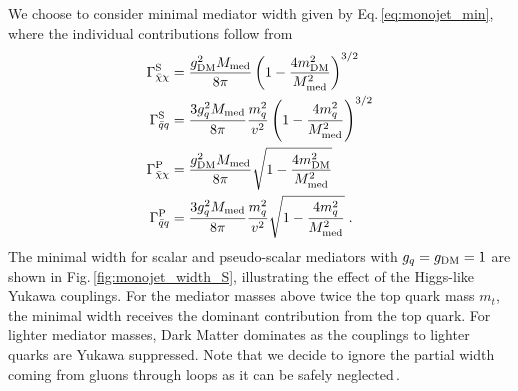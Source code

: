 We choose to consider minimal mediator width given by Eq.\,\ref{eq:monojet_min}, where the individual contributions follow from
\begin{align}
\Gamma_{\bar{\chi}\chi}^{\rm{S}}&=\frac{\gDM^2 \mMed}{8\pi}\left(1-\frac{4 \mDM^2}{\mMed^2} \right)^{3/2}\\
\Gamma_{\bar{q}q}^{\rm{S}}&= \frac{3 \gq^2 \mMed}{8\pi}\frac{m_q^2}{v^2}\left(1-\frac{4 m_q^2}{\mMed^2}\right)^{3/2}\\
\Gamma_{\bar{\chi}\chi}^{\rm{P}}&=\frac{\gDM^2 \mMed}{8\pi} \sqrt{1-\frac{4 \mDM^2}{\mMed^2}}\\
\Gamma_{\bar{q}q}^{\rm{P}}&= \frac{3 \gq^2 \mMed}{8\pi}\frac{m_q^2}{v^2}\sqrt{1-\frac{4 m_q^2}{\mMed^2}}\label{eq:Gamma4}\;.
\end{align}
The minimal width for scalar and pseudo-scalar mediators with $g_q=g_{\rm{DM}}=1$ are shown in Fig.\,\ref{fig:monojet_width_S}, illustrating the effect of the Higgs-like Yukawa couplings. For the mediator masses above twice the top quark mass $m_t$, the minimal width receives the dominant contribution from the top quark. For lighter mediator masses, Dark Matter dominates as the couplings to lighter quarks are Yukawa suppressed.
Note that we decide to ignore the partial width coming from gluons through loops as it can be safely neglected\,\cite{Haisch:2015ioa}.



